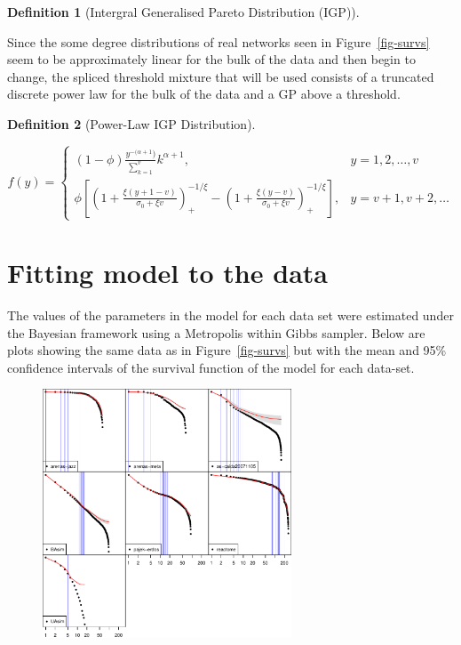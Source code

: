 \documentclass[
  10pt,
  a4paper,
]{scrreprt}
\theoremstyle{plain}
\theoremstyle{plain}
\theoremstyle{definition}
\newtheorem{definition}{Definition}[section]
\theoremstyle{plain}
\theoremstyle{remark}
\begin{document}
{\begin{definition}[Intergral Generalised Pareto Distribution
(IGP)]
\end{definition}

Since the some degree distributions of real networks seen in
Figure~\ref{fig-survs} seem to be approximately linear for the bulk of
the data and then begin to change, the spliced threshold mixture that
will be used consists of a truncated discrete power law for the bulk of
the data and a GP above a threshold.

\begin{definition}[Power-Law IGP
Distribution]\protect\hypertarget{def-pligp}{}\label{def-pligp}

\[
f(y) = \begin{cases}
(1-\phi)\displaystyle\frac{y^{-(\alpha+1})}{\sum_{k=1}^v}k^{\alpha+1}, & y=1,2,\ldots, v\\
\phi\left[\left(1+\displaystyle\frac{\xi(y+1-v)}{\sigma_0+\xi v}\right)_+^{-1/\xi}-\left(1+\displaystyle\frac{\xi(y-v)}{\sigma_0+\xi v}\right)_+^{-1/\xi}\right],&y=v+1, v+2,\ldots
\end{cases}
\]

\end{definition}

\hypertarget{fitting-model-to-the-data}{%
\section{Fitting model to the data}\label{fitting-model-to-the-data}}

The values of the parameters in the model for each data set were
estimated under the Bayesian framework using a Metropolis within Gibbs
sampler. Below are plots showing the same data as in
Figure~\ref{fig-survs} but with the mean and 95\% confidence intervals
of the survival function of the model for each data-set.

\begin{figure}[H]

{\centering \includegraphics[width=0.66\textwidth,height=\textheight]{doc_files/figure-pdf/fig-fits1-1.pdf}

}
\end{figure}}
\end{document}
